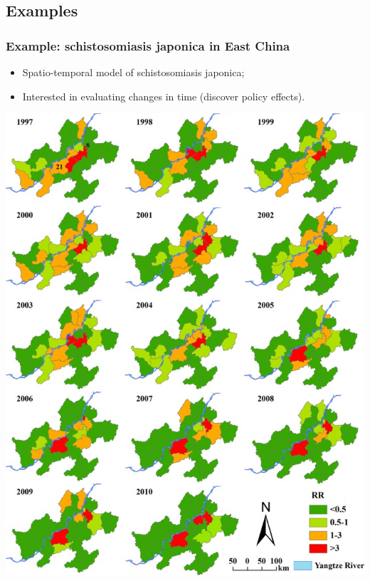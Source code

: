 \documentclass[slidestop,compress,serif,10pt]{beamer}
\begin{document}
%
%
\subsection{Examples}
\begin{frame}\frametitle{Example: schistosomiasis japonica in East China}
\begin{itemize}
\item Spatio-temporal model of schistosomiasis japonica;
\item Interested in evaluating changes in time (discover policy effects). 
\end{itemize}
\begin{center}\includegraphics[scale=0.75]{srep24173-f3}\end{center}

\fontsize{7}{7}
\end{frame}
\end{document}
